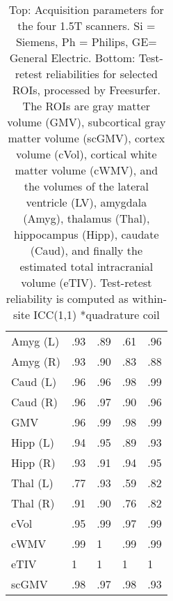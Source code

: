 \begin{table}
\begin{tabular}{lllll}
Amyg (L)              &               .93 &               .89 &                 .61 &                 .96 \\
Amyg (R)              &               .93 &               .90 &                 .83 &                 .88 \\
Caud (L)              &               .96 &               .96 &                 .98 &                 .99 \\
Caud (R)              &               .96 &               .97 &                 .90 &                 .96 \\
GMV                   &               .96 &               .99 &                 .98 &                 .99 \\
Hipp (L)              &               .94 &               .95 &                 .89 &                 .93 \\
Hipp (R)              &               .93 &               .91 &                 .94 &                 .95 \\
Thal (L)              &               .77 &               .93 &                 .59 &                 .82 \\
Thal (R)              &               .91 &               .90 &                 .76 &                 .82 \\
cVol                  &               .95 &               .99 &                 .97 &                 .99 \\
cWMV                  &               .99 &               1 &                 .99 &                 .99 \\
eTIV                  &               1 &               1 &                 1 &                 1 \\
scGMV                 &               .98 &               .97 &                 .98 &                 .93 \\
\bottomrule
\end{tabular}
\caption{Top: Acquisition parameters for the four 1.5T scanners. Si = Siemens, Ph = Philips, GE= General Electric. Bottom: Test-retest reliabilities for selected ROIs, processed by Freesurfer. The ROIs are gray matter volume (GMV), subcortical gray matter volume (scGMV), cortex volume (cVol), cortical white matter volume (cWMV), and the volumes of the lateral ventricle (LV), amygdala (Amyg), thalamus (Thal), hippocampus (Hipp), caudate (Caud), and finally the estimated total intracranial volume (eTIV). Test-retest reliability is computed as within-site ICC(1,1) *quadrature coil} 
\label{tab:acquisition1}

\end{table}